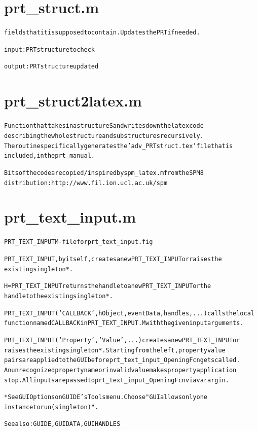 \section{prt\_struct.m}
\begin{alltt}

 fields that it is supposed to contain. Updates the PRT if needed.
 
 input  : PRT structure to check
 
 output : PRT structure updated
\end{alltt}


\section{prt\_struct2latex.m}
\begin{alltt}

 Function that takes in a structure S and writes down the latex code
 describing the whole structure and substructures recursively.
 The routine specifically generates the 'adv\_PRTstruct.tex' file that is
 included, in the prt\_manual.
 
 Bits of the code are copied/inspired by spm\_latex.m from the SPM8
 distribution: http://www.fil.ion.ucl.ac.uk/spm
\end{alltt}


\section{prt\_text\_input.m}
\begin{alltt}

 PRT\_TEXT\_INPUT M-file for prt\_text\_input.fig
 
 PRT\_TEXT\_INPUT, by itself, creates a new PRT\_TEXT\_INPUT or raises the 
 existing singleton*.
 
 H = PRT\_TEXT\_INPUT returns the handle to a new PRT\_TEXT\_INPUT or the 
 handle to the existing singleton*.
 
 PRT\_TEXT\_INPUT('CALLBACK',hObject,eventData,handles,...) calls the local
 function named CALLBACK in PRT\_TEXT\_INPUT.M with the given input arguments.
 
 PRT\_TEXT\_INPUT('Property','Value',...) creates a new PRT\_TEXT\_INPUT or 
 raises the existing singleton*.  Starting from the left, property value 
 pairs are applied to the GUI before prt\_text\_input\_OpeningFcn gets called.
 An unrecognized property name or invalid value makes property application
 stop.  All inputs are passed to prt\_text\_input\_OpeningFcn via varargin.
 
 *See GUI Options on GUIDE's Tools menu.  Choose "GUI allows only one
  instance to run (singleton)".
 
 See also: GUIDE, GUIDATA, GUIHANDLES
\end{alltt}


